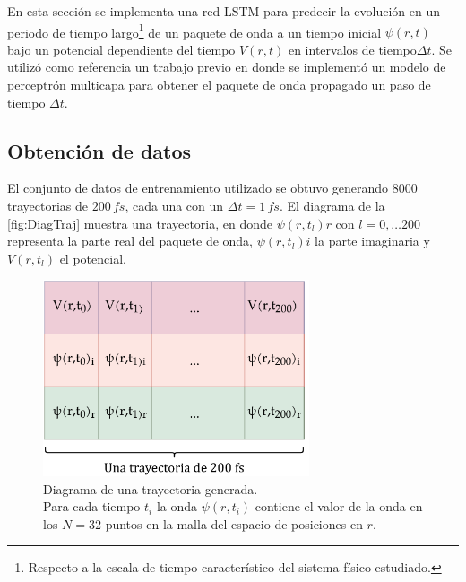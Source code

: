 En esta sección se implementa una red \acs{LSTM} para predecir la evolución en un periodo de tiempo largo\footnote{Respecto a la escala de tiempo característico del sistema físico estudiado.} de un paquete de onda a un tiempo inicial $\psi(r,t)$ bajo un potencial dependiente del tiempo $V(r,t)$ en intervalos de tiempo$\Delta t$. Se utilizó como referencia un trabajo previo \cite{Main:2021} en donde se implementó un modelo de perceptrón multicapa para obtener el paquete de onda propagado un paso de tiempo $\Delta t$.

\subsection{Obtención de datos}\label{sec:6.4.1}

El conjunto de datos de entrenamiento utilizado se obtuvo generando 8000 trayectorias de $200\,fs$, cada una con un $\Delta t = 1\,fs$. El diagrama de la \autoref{fig:DiagTraj} muestra una trayectoria, en donde $\psi(r,t_l)r$ con $l=0,\dots 200$ representa la parte real del paquete de onda, $\psi(r,t_l)i$ la parte imaginaria y $V(r,t_l)$ el potencial.

\begin{figure}[H]
  \centering
  \includegraphics[width=0.7\textwidth]{./img/DiagTrayectoria.png}
  \caption{Diagrama de una trayectoria generada.\\Para cada tiempo $t_i$ la onda $\psi(r,t_i)$ contiene el valor de la onda en los $N=32$ puntos en la malla del espacio de posiciones en $r$.}
  \label{fig:DiagTraj}
\end{figure}

